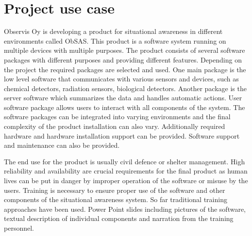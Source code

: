\documentclass[12pt, a4paper,oneside, nocenter]{thesis}
\begin{document}
\chapter{\texorpdfstring{Project use case}{proj-use-case}}
Observis Oy is developing a product for situational awareness in different environments called ObSAS. This product is a software system running on multiple devices with multiple purposes. The product consists of several software packages with different purposes and providing different features. Depending on the project the required packages are selected and used. One main package is the low level software that communicates with various sensors and devices, such as chemical detectors, radiation sensors, biological detectors. Another package is the server software which summarizes the data and handles automatic actions. User software package allows users to interact
with all components of the system. The software packages can be integrated into varying environments and the final complexity of the product installation can also vary. Additionally required hardware and hardware installation support can be provided. Software support and maintenance can also be provided.
\par
The end use for the product is usually civil defence or shelter management. High reliability and availability are crucial requirements for the final product as human lives can be put in danger by improper operation of the software or misuse by the users. Training is necessary to ensure proper use of the software and 
other components of the situational awareness system. So far traditional training approaches have been used. Power Point slides including pictures of the software, textual description of individual components and narration from the training personnel.
\par
\end{document}
